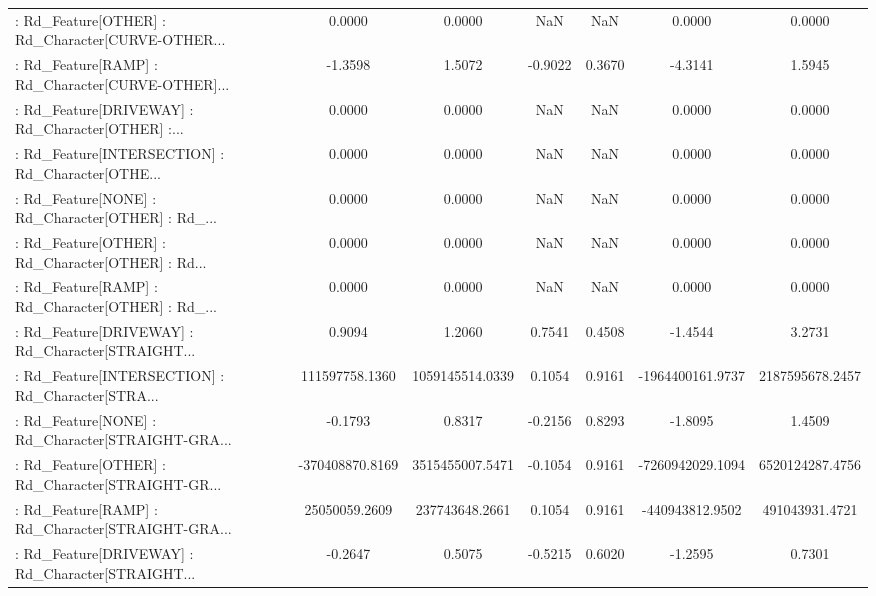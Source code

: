 \begin{longtable}{p{4cm}cccccc}
 : Rd\_Feature[OTHER] : Rd\_Character[CURVE-OTHER... &            0.0000 &            0.0000 &     NaN &          NaN &             0.0000 &            0.0000 \\
 : Rd\_Feature[RAMP] : Rd\_Character[CURVE-OTHER]... &           -1.3598 &            1.5072 & -0.9022 &       0.3670 &            -4.3141 &            1.5945 \\
 : Rd\_Feature[DRIVEWAY] : Rd\_Character[OTHER] :... &            0.0000 &            0.0000 &     NaN &          NaN &             0.0000 &            0.0000 \\
 : Rd\_Feature[INTERSECTION] : Rd\_Character[OTHE... &            0.0000 &            0.0000 &     NaN &          NaN &             0.0000 &            0.0000 \\
 : Rd\_Feature[NONE] : Rd\_Character[OTHER] : Rd\_... &            0.0000 &            0.0000 &     NaN &          NaN &             0.0000 &            0.0000 \\
 : Rd\_Feature[OTHER] : Rd\_Character[OTHER] : Rd... &            0.0000 &            0.0000 &     NaN &          NaN &             0.0000 &            0.0000 \\
 : Rd\_Feature[RAMP] : Rd\_Character[OTHER] : Rd\_... &            0.0000 &            0.0000 &     NaN &          NaN &             0.0000 &            0.0000 \\
 : Rd\_Feature[DRIVEWAY] : Rd\_Character[STRAIGHT... &            0.9094 &            1.2060 &  0.7541 &       0.4508 &            -1.4544 &            3.2731 \\
 : Rd\_Feature[INTERSECTION] : Rd\_Character[STRA... &    111597758.1360 &   1059145514.0339 &  0.1054 &       0.9161 &   -1964400161.9737 &   2187595678.2457 \\
 : Rd\_Feature[NONE] : Rd\_Character[STRAIGHT-GRA... &           -0.1793 &            0.8317 & -0.2156 &       0.8293 &            -1.8095 &            1.4509 \\
 : Rd\_Feature[OTHER] : Rd\_Character[STRAIGHT-GR... &   -370408870.8169 &   3515455007.5471 & -0.1054 &       0.9161 &   -7260942029.1094 &   6520124287.4756 \\
 : Rd\_Feature[RAMP] : Rd\_Character[STRAIGHT-GRA... &     25050059.2609 &    237743648.2661 &  0.1054 &       0.9161 &    -440943812.9502 &    491043931.4721 \\
 : Rd\_Feature[DRIVEWAY] : Rd\_Character[STRAIGHT... &           -0.2647 &            0.5075 & -0.5215 &       0.6020 &            -1.2595 &            0.7301 \\

\end{longtable}
